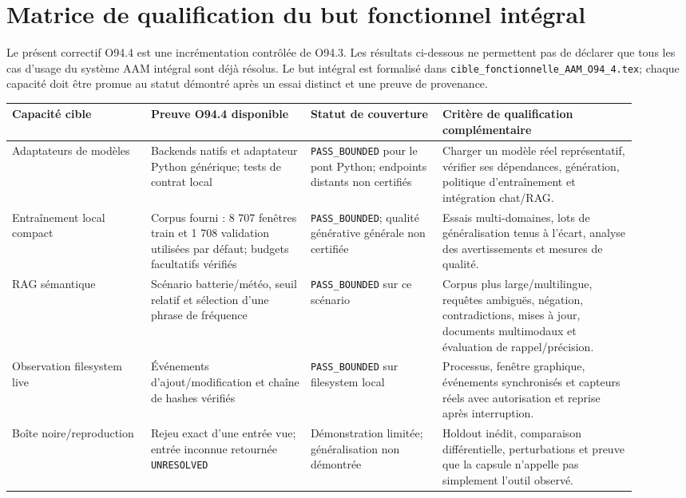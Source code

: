 \section{Matrice de qualification du but fonctionnel intégral}
\label{sec:matrice-cible-aam}
Le présent correctif O94.4 est une incrémentation contrôlée de O94.3. Les résultats ci-dessous ne permettent pas de déclarer que tous les cas d'usage du système AAM intégral sont déjà résolus. Le but intégral est formalisé dans \texttt{cible\_fonctionnelle\_AAM\_O94\_4.tex}; chaque capacité doit être promue au statut démontré après un essai distinct et une preuve de provenance.

\begin{longtable}{p{0.20\linewidth}p{0.23\linewidth}p{0.19\linewidth}p{0.29\linewidth}}
\toprule
\textbf{Capacité cible} & \textbf{Preuve O94.4 disponible} & \textbf{Statut de couverture} & \textbf{Critère de qualification complémentaire}\\
\midrule
\endhead
Adaptateurs de modèles & Backends natifs et adaptateur Python générique; tests de contrat local & \texttt{PASS\_BOUNDED} pour le pont Python; endpoints distants non certifiés & Charger un modèle réel représentatif, vérifier ses dépendances, génération, politique d'entraînement et intégration chat/RAG.\\
Entraînement local compact & Corpus fourni : 8 707 fenêtres train et 1 708 validation utilisées par défaut; budgets facultatifs vérifiés & \texttt{PASS\_BOUNDED}; qualité générative générale non certifiée & Essais multi-domaines, lots de généralisation tenus à l'écart, analyse des avertissements et mesures de qualité.\\
RAG sémantique & Scénario batterie/météo, seuil relatif et sélection d'une phrase de fréquence & \texttt{PASS\_BOUNDED} sur ce scénario & Corpus plus large/multilingue, requêtes ambiguës, négation, contradictions, mises à jour, documents multimodaux et évaluation de rappel/précision.\\
Observation filesystem live & Événements d'ajout/modification et chaîne de hashes vérifiés & \texttt{PASS\_BOUNDED} sur filesystem local & Processus, fenêtre graphique, événements synchronisés et capteurs réels avec autorisation et reprise après interruption.\\
Boîte noire/reproduction & Rejeu exact d'une entrée vue; entrée inconnue retournée \texttt{UNRESOLVED} & Démonstration limitée; généralisation non démontrée & Holdout inédit, comparaison différentielle, perturbations et preuve que la capsule n'appelle pas simplement l'outil observé.\\

\end{longtable}
